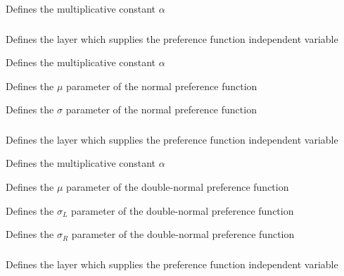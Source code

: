  {Defines the multiplicative constant $\alpha$}

\subsubsection[Normal]{}

 {Defines the layer which supplies the preference function independent variable}

 {Defines the multiplicative constant $\alpha$}

 {Defines the $\mu$ parameter of the normal preference function}

 {Defines the $\sigma$ parameter of the normal preference function}

\subsubsection[Double-normal]{}

 {Defines the layer which supplies the preference function independent variable}

 {Defines the multiplicative constant $\alpha$}

 {Defines the $\mu$ parameter of the double-normal preference function}

 {Defines the $\sigma_L$ parameter of the double-normal preference function}

 {Defines the $\sigma_R$ parameter of the double-normal preference function}

\subsubsection[Logistic]{}

 {Defines the layer which supplies the preference function independent variable}

